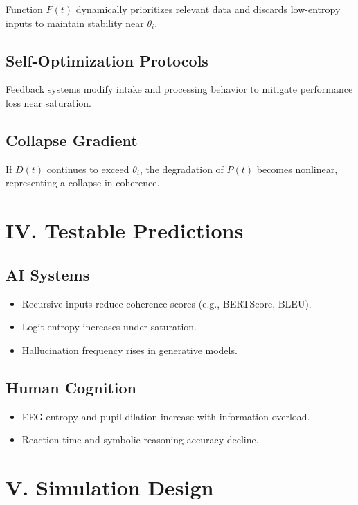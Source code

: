 \documentclass[12pt]{article}
\begin{document}
Function $F(t)$ dynamically prioritizes relevant data and discards low-entropy inputs to maintain stability near $\theta_i$.

\subsection*{Self-Optimization Protocols}

Feedback systems modify intake and processing behavior to mitigate performance loss near saturation.

\subsection*{Collapse Gradient}

If $D(t)$ continues to exceed $\theta_i$, the degradation of $P(t)$ becomes nonlinear, representing a collapse in coherence.

\section*{IV. Testable Predictions}

\subsection*{AI Systems}

\begin{itemize}
  \item Recursive inputs reduce coherence scores (e.g., BERTScore, BLEU).
  \item Logit entropy increases under saturation.
  \item Hallucination frequency rises in generative models.
\end{itemize}

\subsection*{Human Cognition}

\begin{itemize}
  \item EEG entropy and pupil dilation increase with information overload.
  \item Reaction time and symbolic reasoning accuracy decline.
\end{itemize}

\section*{V. Simulation Design}
\end{document}
